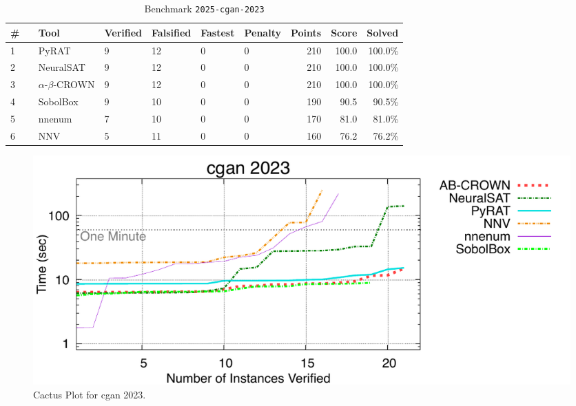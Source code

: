 \begin{table}[h]
\begin{center}
\caption{Benchmark \texttt{2025-cgan-2023}} \label{tab:cat_2025_cgan_2023}
{\setlength{\tabcolsep}{2pt}
\begin{tabular}[h]{@{}llllllrrr@{}}
\toprule
\textbf{\# ~} & \textbf{Tool} & \textbf{Verified} & \textbf{Falsified} & \textbf{Fastest} & \textbf{Penalty} & \textbf{Points} & \textbf{Score} & \textbf{Solved}\\
\midrule
1 & PyRAT & 9 & 12 & 0 & 0 & 210 & 100.0 & 100.0\% \\
2 & NeuralSAT & 9 & 12 & 0 & 0 & 210 & 100.0 & 100.0\% \\
3 & $\alpha$-$\beta$-CROWN & 9 & 12 & 0 & 0 & 210 & 100.0 & 100.0\% \\
4 & SobolBox & 9 & 10 & 0 & 0 & 190 & 90.5 & 90.5\% \\
5 & nnenum & 7 & 10 & 0 & 0 & 170 & 81.0 & 81.0\% \\
6 & NNV & 5 & 11 & 0 & 0 & 160 & 76.2 & 76.2\% \\
\bottomrule
\end{tabular}
}
\end{center}
\end{table}



\begin{figure}[h]
\centerline{\includegraphics[width=\textwidth]{cactus/2025_cgan_2023.pdf}}
\caption{Cactus Plot for cgan 2023.}
\label{fig:quantPic}
\end{figure}


\clearpage

